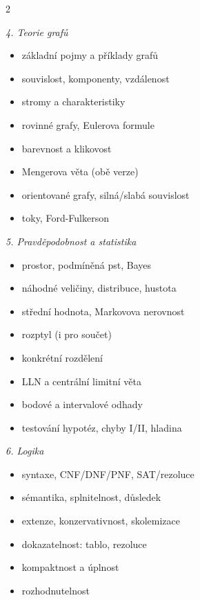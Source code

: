 \begin{multicols}{2}
\begin{itemize}[label=\checkmark,leftmargin=1.3em,itemsep=0pt]
\end{itemize}
\textit{4. Teorie grafů}
\begin{itemize}[label=\checkmark,leftmargin=1.3em,itemsep=0pt]
  \item základní pojmy a příklady grafů
  \item souvislost, komponenty, vzdálenost
  \item stromy a charakteristiky
  \item rovinné grafy, Eulerova formule
  \item barevnost a klikovost
  \item Mengerova věta (obě verze)
  \item orientované grafy, silná/slabá souvislost
  \item toky, Ford-Fulkerson
\end{itemize}
\textit{5. Pravděpodobnost a statistika}
\begin{itemize}[label=\checkmark,leftmargin=1.3em,itemsep=0pt]
  \item prostor, podmíněná pst, Bayes
  \item náhodné veličiny, distribuce, hustota
  \item střední hodnota, Markovova nerovnost
  \item rozptyl (i pro součet)
  \item konkrétní rozdělení
  \item LLN a centrální limitní věta
  \item bodové a intervalové odhady
  \item testování hypotéz, chyby I/II, hladina
\end{itemize}
\textit{6. Logika}
\begin{itemize}[label=\checkmark,leftmargin=1.3em,itemsep=0pt]
  \item syntaxe, CNF/DNF/PNF, SAT/rezoluce
  \item sémantika, splnitelnost, důsledek
  \item extenze, konzervativnost, skolemizace
  \item dokazatelnost: tablo, rezoluce
  \item kompaktnost a úplnost
  \item rozhodnutelnost
\end{itemize}
\end{multicols}

